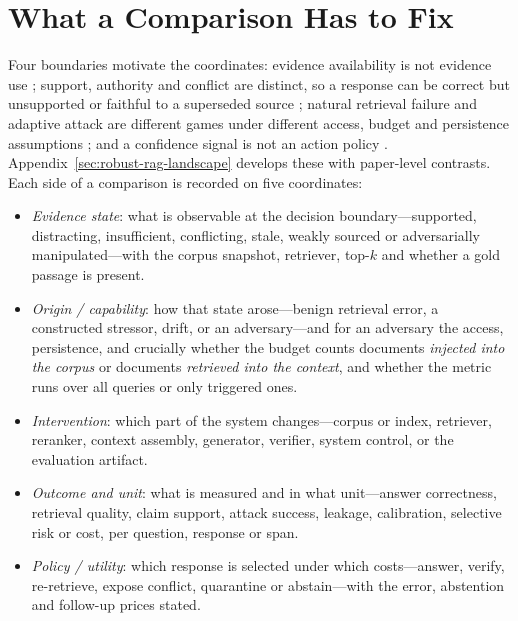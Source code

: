 \documentclass[11pt]{article}
\begin{document}
\section{What a Comparison Has to Fix}
\label{sec:estimands}

Four boundaries motivate the coordinates: evidence availability is not evidence
use \citep{irrelevantContext2023,raat2024,rgb2023,chainOfNote2023}; support,
authority and conflict are distinct, so a response can be correct but
unsupported or faithful to a superseded source
\citep{ragTruth2024,astuteRAG2025,freshllms2024}; natural retrieval failure and
adaptive attack are different games under different access, budget and
persistence assumptions \citep{poisonedRAG2024,phantom2024,certifiedRAG2024};
and a confidence signal is not an action policy
\citep{guo2017calibration,geifman2017selective,selfRAG2023,crag2024,
sufficientContext2024}. Appendix~\ref{sec:robust-rag-landscape} develops these
with paper-level contrasts. Each side of a comparison is recorded on five
coordinates:

\begin{itemize}[leftmargin=1.1em,itemsep=0pt,topsep=1pt,parsep=0pt]
\item[\textbf{C1}] \emph{Evidence state}: what is observable at the decision
boundary---supported, distracting, insufficient, conflicting, stale, weakly
sourced or adversarially manipulated---with the corpus snapshot, retriever,
top-$k$ and whether a gold passage is present.
\item[\textbf{C2}] \emph{Origin / capability}: how that state arose---benign
retrieval error, a constructed stressor, drift, or an adversary---and for an
adversary the access, persistence, and crucially whether the budget counts
documents \emph{injected into the corpus} or documents \emph{retrieved into the
context}, and whether the metric runs over all queries or only triggered ones.
\item[\textbf{C3}] \emph{Intervention}: which part of the system changes---corpus
or index, retriever, reranker, context assembly, generator, verifier, system
control, or the evaluation artifact.
\item[\textbf{C4}] \emph{Outcome and unit}: what is measured and in what
unit---answer correctness, retrieval quality, claim support, attack success,
leakage, calibration, selective risk or cost, per question, response or span.
\item[\textbf{C5}] \emph{Policy / utility}: which response is selected under
which costs---answer, verify, re-retrieve, expose conflict, quarantine or
abstain---with the error, abstention and follow-up prices stated.
\end{itemize}
\end{document}
